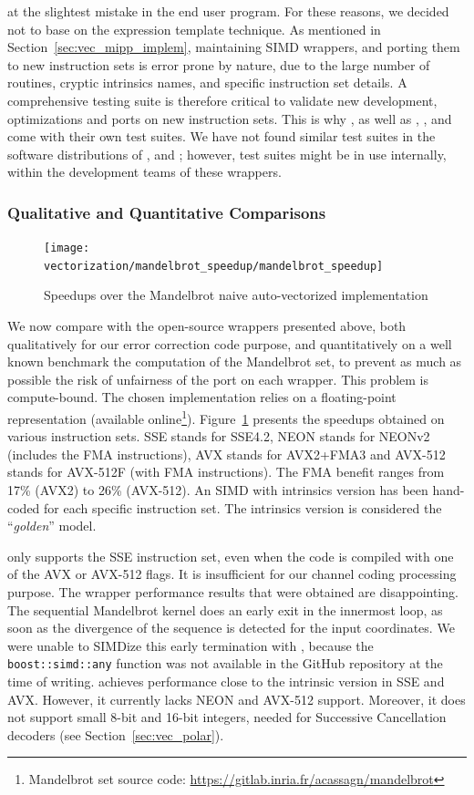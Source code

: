 at the slightest mistake in the end user program. For these reasons, we decided
not to base \MIPP on the expression template technique. As mentioned in
Section~\ref{sec:vec_mipp_implem}, maintaining SIMD wrappers, and porting them
to new instruction sets is error prone by nature, due to the large number of
routines, cryptic intrinsics names, and specific instruction set details. A
comprehensive testing suite is therefore critical to validate new development,
optimizations and ports on new instruction sets. This is why \MIPP, as well as
\Vc, \BoostSIMD, \simdpp and \bSIMD come with their own test suites. We have not
found similar test suites in the software distributions of \VCL, \xsimd and
\TSIMD; however, test suites might be in use internally, within the development
teams of these wrappers.

\subsubsection{Qualitative and Quantitative Comparisons}

\begin{figure}
  \centering
  \texttt{[image: vectorization/mandelbrot\_speedup/mandelbrot\_speedup]}
  \caption{Speedups over the Mandelbrot naive auto-vectorized implementation}
  \label{plot:vec_mandelbrot}
\end{figure}

We now compare \MIPP with the open-source wrappers presented above, both
qualitatively for our error correction code purpose, and quantitatively on a
well known benchmark the computation of the Mandelbrot set, to prevent as much
as possible the risk of unfairness of the port on each wrapper. This problem is
compute-bound. The chosen implementation relies on a floating-point
representation (available online\footnote{Mandelbrot set source code:
\url{https://gitlab.inria.fr/acassagn/mandelbrot}}).
Figure~\ref{plot:vec_mandelbrot} presents the speedups obtained on various
instruction sets. SSE stands for SSE4.2, NEON stands for NEONv2 (includes the
FMA instructions), AVX stands for AVX2+FMA3 and AVX-512 stands for AVX-512F
(with FMA instructions). The FMA benefit ranges from 17\% (AVX2) to 26\%
(AVX-512). An SIMD with intrinsics version has been hand-coded for each
specific instruction set. The intrinsics version is considered the
``\emph{golden}'' model.

\textbf{\BoostSIMD} only supports the SSE instruction set, even when the code is
compiled with one of the AVX or AVX-512 flags. It is insufficient for our
channel coding processing purpose. The \BoostSIMD wrapper performance results
that were obtained are disappointing. The sequential Mandelbrot kernel does an
early exit in the innermost loop, as soon as the divergence of the sequence is
detected for the input coordinates. We were unable to SIMDize this early
termination with \BoostSIMD, because the \verb|boost::simd::any| function was
not available in the GitHub repository at the time of writing. \textbf{\xsimd}
achieves performance close to the intrinsic version in SSE and AVX. However, it
currently lacks NEON and AVX-512 support. Moreover, it does not support small
8-bit and 16-bit integers, needed for Successive Cancellation decoders (see
Section~\ref{sec:vec_polar}).

